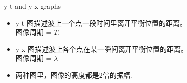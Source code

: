 \documentclass{beamer}
\begin{document}
\begin{frame}{y-t and y-x graphs}
	\begin{itemize}
		\item y-t 图描述波上一个点一段时间里离开平衡位置的距离。\\图像周期 = $T$.
		\item y-x 图描述波上各个点在某一瞬间离开平衡位置的距离。\\图像周期 = $\lambda$
		\item 两种图里，图像的高度都是2倍的振幅.
	\end{itemize}
	
	\begin{center}
	\end{center}
\end{frame}
\end{document}
